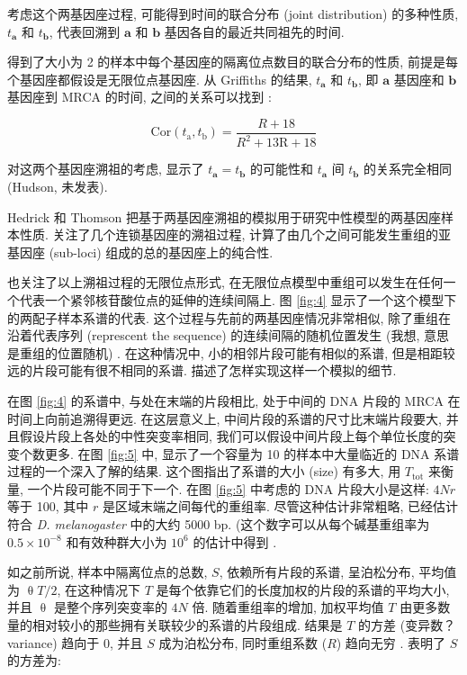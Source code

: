 \documentclass[12pt]{article}
\begin{document}
考虑这个两基因座过程, 可能得到时间的联合分布 (joint distribution) 的多种性质, $t_{\mathbf{a}}$ 和
$t_{\mathbf{b}}$, 代表回溯到 $\mathbf{a}$ 和 $\mathbf{b}$ 基因各自的最近共同祖先的时间.

\textcite{griffiths1981} 得到了大小为 2 的样本中每个基因座的隔离位点数目的联合分布的性质,
前提是每个基因座都假设是无限位点基因座. 从 Griffiths 的结果, $t_{\mathbf{a}}$ 和 $t_{\mathbf{b}}$, 即
$\mathbf{a}$ 基因座和 $\mathbf{b}$ 基因座到 MRCA 的时间, 之间的关系可以找到 \parencite{hudson1983a, kaplan1985}:

\begin{equation} \label{eq:13}
    \text{Cor}(t_{\mathrm{a}},t_{\mathrm{b}})=\frac{R+18}{R^{2}+13\mathrm{R}+18}
\end{equation}

对这两个基因座溯祖的考虑, 显示了 $t_{\mathbf{a}}=t_{\mathbf{b}}$ 的可能性和 $t_{\mathbf{a}}$ 间
$t_{\mathbf{b}}$ 的关系完全相同 (Hudson, 未发表).

Hedrick 和 Thomson 把基于两基因座溯祖的模拟用于研究中性模型的两基因座样本性质. \textcite{kaplan1985}
关注了几个连锁基因座的溯祖过程, 计算了由几个之间可能发生重组的亚基因座 (sub-loci) 组成的总的基因座上的纯合性.

\textcite{hudson1983a, kaplan1985} 也关注了以上溯祖过程的无限位点形式,
在无限位点模型中重组可以发生在任何一个代表一个紧邻核苷酸位点的延伸的连续间隔上. 图 \ref{fig:4}
显示了一个这个模型下的两配子样本系谱的代表. 这个过程与先前的两基因座情况非常相似, 除了重组在沿着代表序列 (represcent the
sequence) 的连续间隔的随机位置发生 (我想, 意思是重组的位置随机) . 在这种情况中, 小的相邻片段可能有相似的系谱,
但是相距较远的片段可能有很不相同的系谱. \textcite{hudson1983a} 描述了怎样实现这样一个模拟的细节.

在图 \ref{fig:4} 的系谱中, 与处在末端的片段相比, 处于中间的 DNA 片段的 MRCA 在时间上向前追溯得更远. 在这层意义上,
中间片段的系谱的尺寸比末端片段要大, 并且假设片段上各处的中性突变率相同, 我们可以假设中间片段上每个单位长度的突变个数更多.
在图 \ref{fig:5} 中, 显示了一个容量为 10 的样本中大量临近的 DNA 系谱过程的一个深入了解的结果. 这个图指出了系谱的大小 (size)
有多大, 用 $T_{\text{tot}}$ 来衡量, 一个片段可能不同于下一个. 在图 \ref{fig:5} 中考虑的 DNA 片段大小是这样: $4Nr$ 等于 100, 其中
$r$ 是区域末端之间每代的重组率. 尽管这种估计非常粗略, 已经估计符合 \textit{D. melanogaster} 中的大约 5000 bp.
(这个数字可以从每个碱基重组率为 $0.5\times 10^{-8}$ 和有效种群大小为 $10^{6}$ 的估计中得到 \parencite{hudson1987, hudson1988}.

如之前所说, 样本中隔离位点的总数, $S$, 依赖所有片段的系谱, 呈泊松分布, 平均值为 $\uptheta T/2$, 在这种情况下 $T$
是每个依靠它们的长度加权的片段的系谱的平均大小, 并且 $\uptheta$ 是整个序列突变率的 $4N$ 倍. 随着重组率的增加, 加权平均值
$T$ 由更多数量的相对较小的那些拥有关联较少的系谱的片段组成. 结果是 $T$ 的方差 (变异数？ variance) 趋向于 0, 并且 $S$
成为泊松分布, 同时重组系数 ($R$) 趋向无穷 \parencite{ewens2012mathematical}. \textcite{kaplan1985} 表明了 $S$
的方差为:
\end{document}
